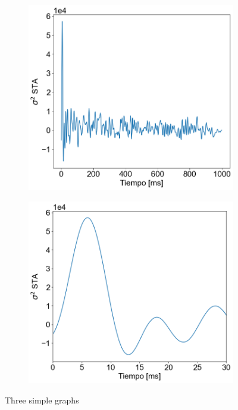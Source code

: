 \documentclass[aps,prb,twocolumn,superscriptaddress,floatfix,longbibliography]{revtex4-2}
\begin{document}
\section{}


\begin{figure}
  \centering
  \begin{subfigure}[b]{0.3\textwidth}
      \centering
      \includegraphics[width=\textwidth]{STA_total.png}
      \caption{\label{fig:STA_total}}
      \end{subfigure}
  \hfill
  \begin{subfigure}[b]{0.3\textwidth}
      \centering
      \includegraphics[width=\textwidth]{STA_parcial.png}
      \caption{\label{fig:STA_parcial}}
  \end{subfigure}
     \caption{Three simple graphs}
     \label{fig:STA}
\end{figure}
\end{document}
